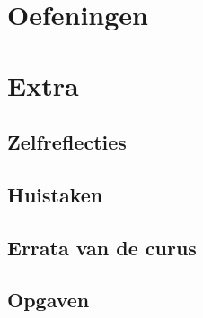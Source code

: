 \documentclass[a4paper,10pt,oneside]{book}
\begin{document}
\part{Oefeningen}







\part{Extra}





\chapter{Zelfreflecties}







\chapter{Huistaken}



\appendix
\chapter{Errata van de curus}


\chapter{Opgaven}






\end{document}
